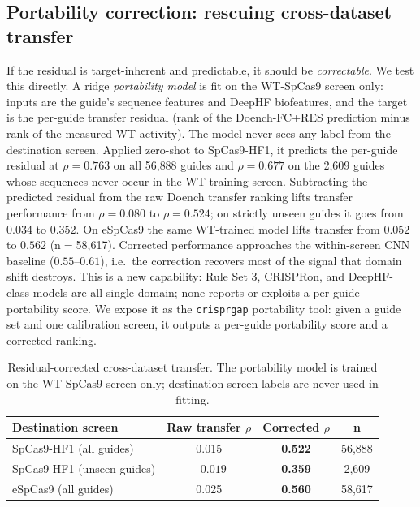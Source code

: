 \documentclass[12pt]{article}
\begin{document}
\subsection{Portability correction: rescuing cross-dataset transfer}
\label{sec:porta}
If the residual is target-inherent and predictable, it should be
\emph{correctable}. We test this directly. A ridge \emph{portability model}
is fit on the WT-SpCas9 screen only: inputs are the guide's sequence
features and DeepHF biofeatures, and the target is the per-guide transfer
residual (rank of the Doench-FC+RES prediction minus rank of the measured
WT activity). The model never sees any label from the destination screen.
Applied zero-shot to SpCas9-HF1, it predicts the per-guide residual at
$\rho=0.763$ on all 56{,}888 guides and $\rho=0.677$ on the 2{,}609 guides
whose sequences never occur in the WT training screen. Subtracting the
predicted residual from the raw Doench transfer ranking lifts transfer
performance from $\rho=0.080$ to $\rho=0.524$; on
strictly unseen guides it goes from $0.034$ to $0.352$.
On eSpCas9 the same WT-trained model lifts transfer from $0.052$ to
$0.562$ (n$=$58{,}617). Corrected performance approaches the within-screen
CNN baseline ($0.55$--$0.61$), i.e.\ the correction recovers most of the
signal that domain shift destroys. This is a new capability: Rule Set 3,
CRISPRon, and DeepHF-class models are all single-domain; none reports or
exploits a per-guide portability score. We expose it as the
\texttt{crisprgap} portability tool: given a guide set and one calibration
screen, it outputs a per-guide portability score and a corrected ranking.

\begin{table}[h]
\centering
\caption{Residual-corrected cross-dataset transfer. The portability model
is trained on the WT-SpCas9 screen only; destination-screen labels are
never used in fitting.}
\label{tab:porta}
\begin{tabular}{lccc}
\hline
Destination screen & Raw transfer $\rho$ & Corrected $\rho$ & n \\
\hline
SpCas9-HF1 (all guides) & 0.015 & \textbf{0.522} & 56{,}888 \\
SpCas9-HF1 (unseen guides) & $-0.019$ & \textbf{0.359} & 2{,}609 \\
eSpCas9 (all guides) & 0.025 & \textbf{0.560} & 58{,}617 \\
\hline
\end{tabular}
\end{table}


\end{document}
